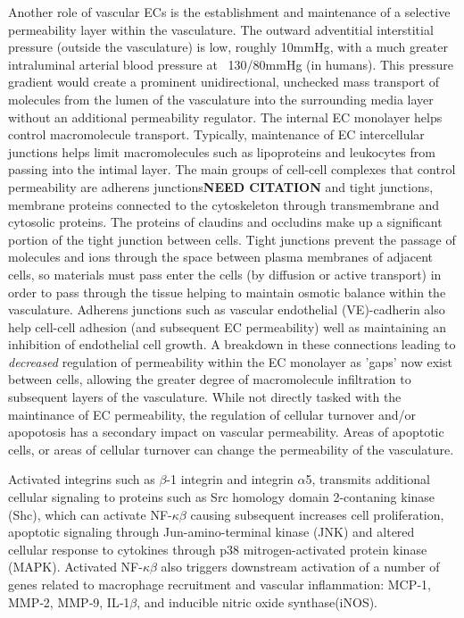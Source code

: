 Another role of vascular ECs is the establishment and maintenance of a selective permeability layer within the vasculature\cite{claesson2015vascular,cahill2016vascular}. The outward adventitial interstitial pressure (outside the vasculature) is low, roughly 10mmHg, with a much greater intraluminal arterial blood pressure at ~130/80mmHg (in humans)\cite{stanger2019surgical}. This pressure gradient would create a prominent unidirectional, unchecked mass transport of molecules from the lumen of the vasculature into the surrounding media layer without an additional permeability regulator. The internal EC monolayer helps control macromolecule transport. Typically, maintenance of EC intercellular junctions helps limit macromolecules such as lipoproteins and leukocytes from passing into the intimal layer\cite{gimbrone2016endothelial,Mundi2017}. The main groups of cell-cell complexes that control permeability are adherens junctions\textbf{NEED CITATION} and tight junctions\cite{zhang2016tight}, membrane proteins connected to the cytoskeleton through transmembrane and cytosolic proteins. The proteins of claudins and occludins make up a significant portion of the tight junction between cells\cite{chattopadhyay2014vascular,zhang2016tight}. Tight junctions prevent the passage of molecules and ions through the space between plasma membranes of adjacent cells, so materials must pass enter the cells (by diffusion or active transport) in order to pass through the tissue helping to maintain osmotic balance within the vasculature. Adherens junctions such as vascular endothelial (VE)-cadherin also help cell-cell adhesion (and subsequent EC permeability) well as maintaining an inhibition of endothelial cell growth. A breakdown in these connections leading to \textit{decreased} regulation of permeability within the EC monolayer as 'gaps' now exist between cells, allowing the greater degree of macromolecule infiltration to subsequent layers of the vasculature. While not directly tasked with the maintinance of EC permeability, the regulation of cellular turnover and/or apopotosis has a secondary impact on vascular permeability\cite{qiu2014biomechanical}. Areas of apoptotic cells, or areas of cellular turnover can change the permeability of the vasculature. 

Activated integrins such as $\beta$-1 integrin and integrin $\alpha$5, transmits additional cellular signaling to proteins such as Src homology domain 2-contaning kinase (Shc), which can activate NF-$\kappa\beta$ causing subsequent increases cell proliferation, apoptotic signaling through Jun-amino-terminal kinase (JNK) and altered cellular response to cytokines through p38 mitrogen-activated protein kinase (MAPK). Activated NF-$\kappa\beta$ also triggers downstream activation of a number of genes related to macrophage recruitment and vascular inflammation: MCP‑1, MMP‑2, MMP‑9, IL‑1$\beta$, and inducible nitric oxide synthase(iNOS).


